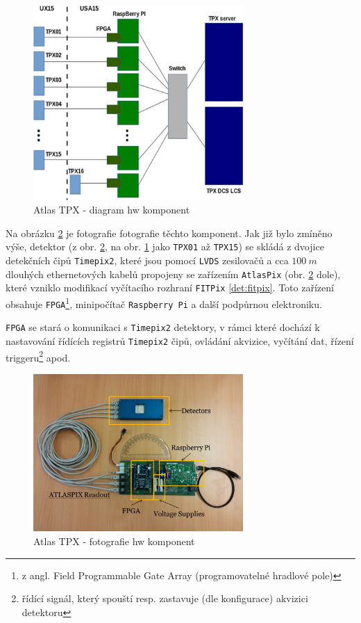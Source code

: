 \begin{figure}[t]
	\begin{center}
		\includegraphics[width=8cm]{figures/tpx_hw_diagram.png}
		\caption{Atlas TPX - diagram hw komponent}
		\label{fig:tpx_hw_diagram}
	\end{center}
\end{figure}

Na obrázku \ref{fig:tpx_hw_foto} je fotografie fotografie těchto komponent. Jak již bylo zmíněno výše, detektor (z obr. \ref{fig:tpx_hw_foto}, na obr. \ref{fig:tpx_hw_diagram} jako \texttt{TPX01} až \texttt{TPX15}) se skládá z dvojice detekčních čipů \texttt{Timepix2}, které jsou pomocí \texttt{LVDS} zesilovačů a cca $100~m$ dlouhých ethernetových kabelů propojeny se zařízením \texttt{AtlasPix} (obr. \ref{fig:tpx_hw_foto} dole), které vzniklo modifikací vyčítacího rozhraní \texttt{FITPix} \ref{det:fitpix}. Toto zařízení obsahuje \texttt{FPGA}\footnote{z angl. Field Programmable Gate Array (programovatelné hradlové pole)}, minipočítač \texttt{Raspberry Pi} a další podpůrnou elektroniku. 

\texttt{FPGA} se stará o komunikaci s \texttt{Timepix2} detektory, v rámci které dochází k nastavování řídících registrů \texttt{Timepix2} čipů, ovládání akvizice, vyčítání dat, řízení triggeru\footnote{řídící signál, který spouští resp. zastavuje (dle konfigurace) akvizici detektoru} apod.

\begin{figure}[t]
	\begin{center}
		\includegraphics[width=8cm]{figures/tpx_hw_foto.png}
		\caption{Atlas TPX - fotografie hw komponent}
		\label{fig:tpx_hw_foto}
	\end{center}
\end{figure}

